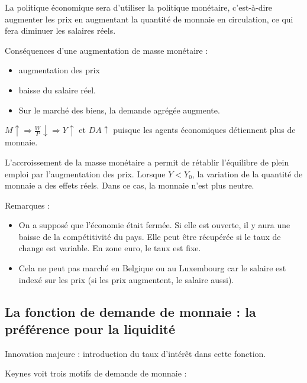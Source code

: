 	La politique économique sera d'utiliser la politique monétaire, c'est-à-dire augmenter les prix en augmentant la quantité de monnaie en circulation, ce qui fera diminuer les salaires réels.
	
	Conséquences d'une augmentation de masse monétaire :
	
	\begin{itemize}
		\item augmentation des prix
		\item baisse du salaire réel.
		\item Sur le marché des biens, la demande agrégée augmente.
	\end{itemize}
	
	$M \uparrow \Rightarrow \frac{W}{P} \downarrow \Rightarrow Y \uparrow$ et $DA \uparrow$ puisque les agents économiques détiennent plus de monnaie.
	
	L'accroissement de la masse monétaire a permit de rétablir l'équilibre de plein emploi par l'augmentation des prix. Lorsque $Y < Y_0$, la variation de la quantité de monnaie a des effets réels. Dans ce cas, la monnaie n'est plus neutre.
	
	Remarques :
	
	\begin{itemize}
		\item On a supposé que l'économie était fermée. Si elle est ouverte, il y aura une baisse de la compétitivité du pays. Elle peut être récupérée si le taux de change est variable. En zone euro, le taux est fixe.
		\item Cela ne peut pas marché en Belgique ou au Luxembourg car le salaire est indexé sur les prix (si les prix augmentent, le salaire aussi).
	\end{itemize}
	
	\subsection{La fonction de demande de monnaie : la préférence pour la liquidité}
	
	Innovation majeure : introduction du taux d'intérêt dans cette fonction.
	
	Keynes voit trois motifs de demande de monnaie :
	
